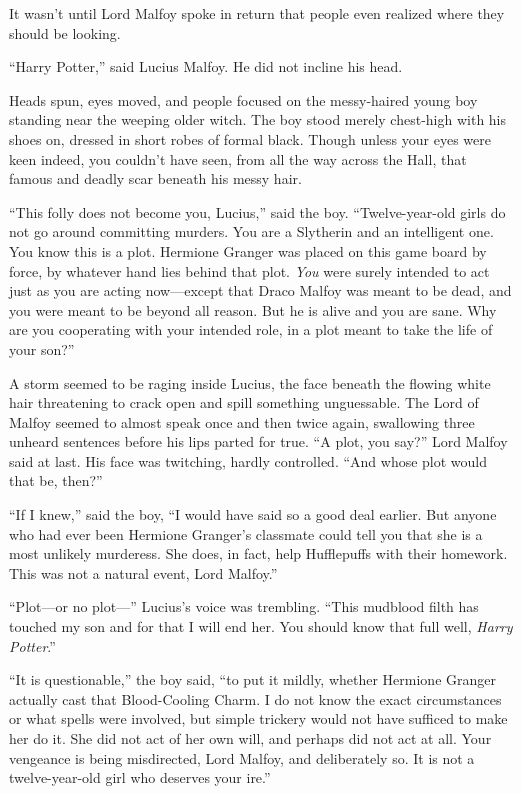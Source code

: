 It wasn’t until Lord Malfoy spoke in return that people even realized where they should be looking.

“Harry Potter,” said Lucius Malfoy. He did not incline his head.

Heads spun, eyes moved, and people focused on the messy-haired young boy standing near the weeping older witch. The boy stood merely chest-high with his shoes on, dressed in short robes of formal black. Though unless your eyes were keen indeed, you couldn’t have seen, from all the way across the Hall, that famous and deadly scar beneath his messy hair.

“This folly does not become you, Lucius,” said the boy. “Twelve-year-old girls do not go around committing murders. You are a Slytherin and an intelligent one. You know this is a plot. Hermione Granger was placed on this game board by force, by whatever hand lies behind that plot. \emph{You} were surely intended to act just as you are acting now—except that Draco Malfoy was meant to be dead, and you were meant to be beyond all reason. But he is alive and you are sane. Why are you cooperating with your intended role, in a plot meant to take the life of your son?”

A storm seemed to be raging inside Lucius, the face beneath the flowing white hair threatening to crack open and spill something unguessable. The Lord of Malfoy seemed to almost speak once and then twice again, swallowing three unheard sentences before his lips parted for true. “A plot, you say?” Lord Malfoy said at last. His face was twitching, hardly controlled. “And whose plot would that be, then?”

“If I knew,” said the boy, “I would have said so a good deal earlier. But anyone who had ever been Hermione Granger’s classmate could tell you that she is a most unlikely murderess. She does, in fact, help Hufflepuffs with their homework. This was not a natural event, Lord Malfoy.”

“Plot—or no plot—” Lucius’s voice was trembling. “This mudblood filth has touched my son and for that I will end her. You should know that full well, \emph{Harry Potter}.”

“It is questionable,” the boy said, “to put it mildly, whether Hermione Granger actually cast that Blood-Cooling Charm. I do not know the exact circumstances or what spells were involved, but simple trickery would not have sufficed to make her do it. She did not act of her own will, and perhaps did not act at all. Your vengeance is being misdirected, Lord Malfoy, and deliberately so. It is not a twelve-year-old girl who deserves your ire.”

